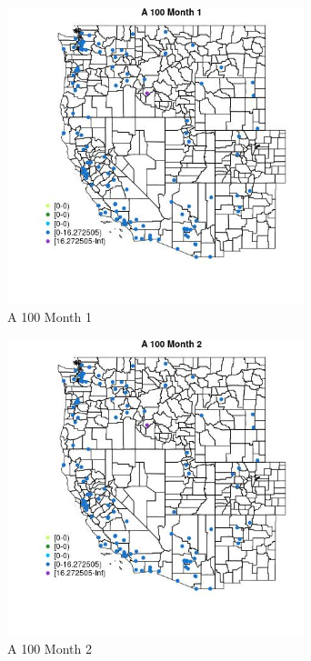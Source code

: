 \begin{figure} 
\centering  
\includegraphics[width=0.77\textwidth]{Code_Outputs/Report_ML_input_PM25_Step4_part_e_de_duplicated_aves_MapObsMo1A_100.jpg} 
\caption{\label{fig:Report_ML_input_PM25_Step4_part_e_de_duplicated_avesMapObsMo1A_100}A 100 Month 1} 
\end{figure} 
 

\begin{figure} 
\centering  
\includegraphics[width=0.77\textwidth]{Code_Outputs/Report_ML_input_PM25_Step4_part_e_de_duplicated_aves_MapObsMo2A_100.jpg} 
\caption{\label{fig:Report_ML_input_PM25_Step4_part_e_de_duplicated_avesMapObsMo2A_100}A 100 Month 2} 
\end{figure} 
 

